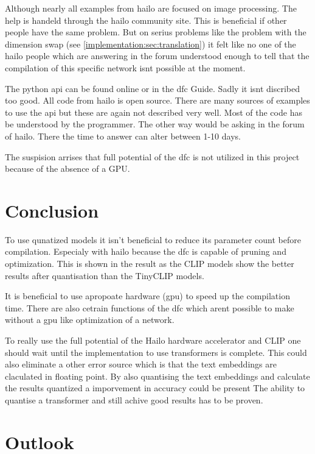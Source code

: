 Although nearly all examples from hailo are focused on image processing.
The help is handeld through the hailo community site.
This is beneficial if other people have the same problem.
But on serius problems like the problem with the dimension swap (see \cref{implementation:sec:translation}) it felt like no one of the hailo people which are answering in the forum understood enough to tell that the compilation of this specific network isnt possible at the moment.

The python \acrfull{api} can be found online or in the \acrshort{dfc} Guide.
Sadly it isnt discribed too good.
All code from hailo is open source.
There are many sources of examples to use the \acrshort{api} but these are again not described very well.
Most of the code has be understood by the programmer.
The other way would be asking in the forum of hailo.
There the time to answer can alter between 1-10 days.

The suspision arrises that full potential  of the \acrshort{dfc}  is not utilized in this project because of the absence of a GPU.

\section{Conclusion}

To use qunatized models it isn't beneficial to reduce its parameter count before compilation.
Especialy with hailo because the \acrshort{dfc} is capable of pruning and optimization.
This is shown in the result as the CLIP models show the better results after quantisation than the TinyCLIP models.

It is beneficial to use apropoate hardware (\acrshort{gpu}) to speed up the compilation time.
There are also cetrain functions of the \acrshort{dfc} which arent possible to make without a \acrshort{gpu} like optimization of a network.

To really use the full potential of the Hailo hardware accelerator and CLIP one should wait until the implementation to use transformers is complete.
This could also eliminate a other error source which is that the text embeddings are claculated in floating point.
By also quantising the text embeddings and calculate the results quantized a imporvement in accuracy could be present
The ability to quantise a transformer and still achive good results has to be proven.

\section{Outlook}

